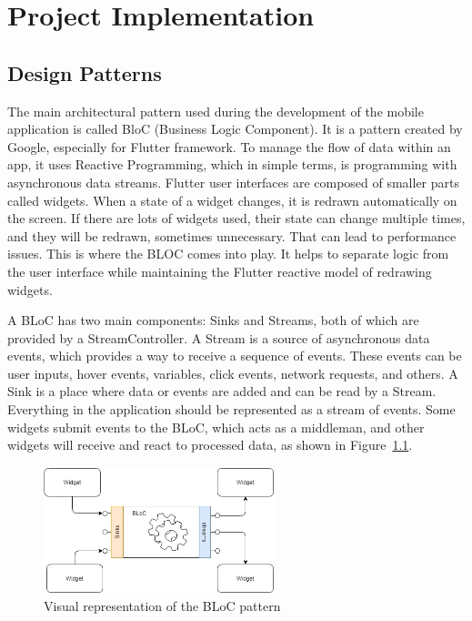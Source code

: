 \chapter{Project Implementation}
\section{Design Patterns}
The main architectural pattern used during the development of the mobile application is called BloC (Business Logic Component). It is a pattern created by Google, especially for Flutter framework. To manage the flow of data within an app, it uses Reactive Programming, which in simple terms, is programming with asynchronous data streams. Flutter user interfaces are composed of smaller parts called widgets. When a state of a widget changes, it is redrawn automatically on the screen. If there are lots of widgets used, their state can change multiple times, and they will be redrawn, sometimes unnecessary. That can lead to performance issues. This is where the BLOC comes into play. It helps to separate logic from the user interface while maintaining the Flutter reactive model of redrawing widgets.

A BLoC has two main components: Sinks and Streams, both of which are provided by a StreamController. A Stream is a source of asynchronous data events, which provides a way to receive a sequence of events. These events can be user inputs, hover events, variables, click events, network requests, and others. A Sink is a place where data or events are added and can be read by a Stream. Everything in the application should be represented as a stream of events. Some widgets submit events to the BLoC, which acts as a middleman, and other widgets will receive and react to processed data, as shown in Figure~\ref{fig:bloc-pattern}.

\begin{figure}[htb]
    \centering
    \includegraphics[width=0.6\textwidth]{fig04/bloc_pattern.png}
    \caption{Visual representation of the BLoC pattern} \label{fig:bloc-pattern}
\end{figure}

